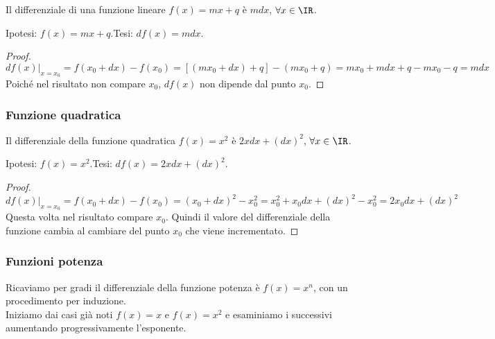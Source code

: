 \begin{teorema}
 Il differenziale di una funzione lineare $f(x)=mx+q$ è $mdx$, 
 $\forall x\in \IR$.
\end{teorema}

\noindent Ipotesi: \(f(x)=mx+q\).\tab Tesi: \(df(x)=mdx\).

\begin{proof}
\[
 df(x)|_{x=x_0}= f(x_0+dx)-f(x_0)=[(mx_0+dx)+q]-(mx_0+q)=mx_0+mdx+q-mx_0-q=mdx
\]
Poiché nel risultato non compare $x_0$, $df(x)$ non dipende dal punto $x_0$.
\end{proof}

\subsubsection{Funzione quadratica}
\label{subsubsec:diff01_diffquad}

\begin{teorema}
 Il differenziale della funzione quadratica $f(x)=x^2$ è $2xdx+(dx)^2$, 
$\forall x\in \IR$.
\end{teorema}

\noindent Ipotesi: \(f(x)=x^2\).\tab Tesi: \(df(x)=2xdx+(dx)^2\).

\begin{proof}
\[
 df(x)|_{x=x_0}= 
f(x_0+dx)-f(x_0)=(x_0+dx)^2-x_0^2=x_0^2+x_0dx+(dx)^2-x_0^2=2x_0dx+(dx)^2
\]
Questa volta nel risultato compare $x_0$. Quindi il valore del differenziale 
della funzione cambia al cambiare del punto $x_0$ che viene incrementato.
\end{proof}

\subsubsection{Funzioni potenza}
\label{subsubsec:diff01_diffpot}
Ricaviamo per gradi il differenziale della funzione potenza è $f(x)=x^n$, con
un procedimento per induzione.\\
Iniziamo dai casi già noti $f(x)=x$ e $f(x)=x^2$ e esaminiamo i successivi
aumentando progressivamente l'esponente.

